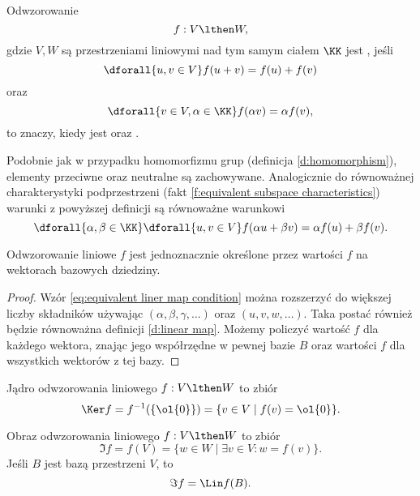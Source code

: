 \begin{definition}
    \label{d:linear map}
    Odwzorowanie
    \[ f : V \lthen W, \]
    gdzie $V, W$ są przestrzeniami liniowymi nad tym samym ciałem $\KK$ jest , jeśli
    \[ \dforall{u, v \in V} f(u + v) = f(u) + f(v) \]
    oraz
    \[ \dforall{v \in V, \alpha \in \KK} f(\alpha v) = \alpha f(v), \]
    to znaczy, kiedy jest  oraz .
\end{definition}

Podobnie jak w przypadku homomorfizmu grup (definicja \ref{d:homomorphism}), elementy przeciwne oraz neutralne są zachowywane. Analogicznie do równoważnej charakterystyki podprzestrzeni (fakt \ref{f:equivalent subspace characteristics}) warunki z powyższej definicji są równoważne warunkowi
\begin{equation}
    \label{eq:equivalent liner map condition}
    \dforall{\alpha, \beta \in \KK}\dforall{u, v \in V} f(\alpha u + \beta v) = \alpha f(u) + \beta f(v).
\end{equation}

\begin{corollary}
    \label{c:linear map is unique by the values f(B)}
    Odwzorowanie liniowe $f$ jest jednoznacznie określone przez wartości $f$ na wektorach bazowych dziedziny.
\end{corollary}
\begin{proof}
    Wzór \ref{eq:equivalent liner map condition} można rozszerzyć do większej liczby składników używając $(\alpha, \beta, \gamma, \ldots)$ oraz $(u, v, w, \ldots)$. Taka postać również będzie równoważna definicji \ref{d:linear map}. Możemy policzyć wartość $f$ dla każdego wektora, znając jego współrzędne w pewnej bazie $B$ oraz wartości $f$ dla wszystkich wektorów z tej bazy.
\end{proof}

\begin{definition}
    Jądro odwzorowania liniowego $f : V \lthen W$ to zbiór
    \[ \Ker f = f^{-1}(\{\ol{0}\}) = \{v \in V \mid f(v) = \ol{0}\}. \]
\end{definition}

\begin{definition}
    Obraz odwzorowania liniowego $f : V \lthen W$ to zbiór
    \[ \Im f = f(V) = \{w \in W \mid \exists v \in V : w = f(v)\}. \]
    Jeśli $B$ jest bazą przestrzeni $V$, to
    \[ \Im f = \Lin f(B). \]
\end{definition}

